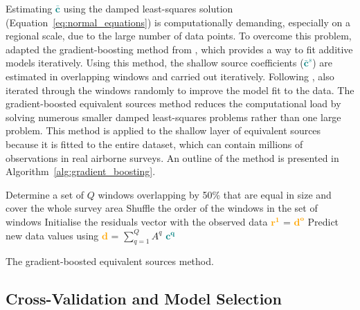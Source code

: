 Estimating \textcolor{teal}{$\bar{\mathbf{c}}$} using the damped least-squares solution (Equation~\ref{eq:normal_equations}) is computationally demanding, especially on a regional scale, due to the large number of data points. 
To overcome this problem, \citet{Soler2021} adapted the gradient-boosting method from \citet{Friedman2001}, which provides a way to fit additive models iteratively. Using this method, the shallow source coefficients (\textcolor{teal}{$\bar{\mathbf{c}}^s$}) are estimated in overlapping windows and carried out iteratively. Following \citet{Friedman2002}, \citet{Soler2021} also iterated through the windows randomly to improve the model fit to the data. The gradient-boosted equivalent sources method reduces the computational load by solving numerous smaller damped least-squares problems rather than one large problem. This method is applied to the shallow layer of equivalent sources because it is fitted to the entire dataset, which can contain millions of observations in real airborne surveys. An outline of the method is presented in Algorithm~\ref{alg:gradient_boosting}.

\begin{algorithm}[!h]
    Determine a set of $Q$ windows overlapping by 50\% that are equal in size and cover the whole survey area
    \;
    Shuffle the order of the windows in the set of windows
    \;
    Initialise the residuals vector with the observed data \textcolor{orange}{$\mathbf{r^1}$} = \textcolor{orange}{$\mathbf{d^o}$}
    \;
    Predict new data values using \textcolor{orange}{$\mathbf{d}$} = $\sum\limits_{q=1}^{Q} A^q$ \textcolor{teal}{$\mathbf{c^q}$}
    \;
    \BlankLine
    \caption{The gradient-boosted equivalent sources method.}
    \label{alg:gradient_boosting}
\end{algorithm}

\subsection{Cross-Validation and Model Selection}

